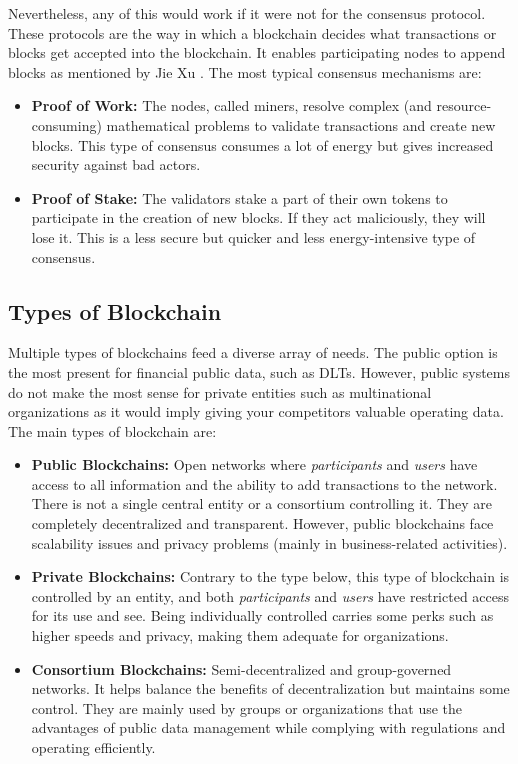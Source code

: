 Nevertheless, any of this would work if it were not for the consensus protocol. These protocols are the way in which a blockchain decides what transactions or blocks get accepted into the blockchain. It enables participating nodes to append blocks as mentioned by Jie Xu \cite{consensusBlockchain}. The most typical consensus mechanisms are:
\begin{itemize}
        \item \textbf{Proof of Work:} The nodes, called miners, resolve complex (and resource-consuming) mathematical problems to validate transactions and create new blocks. This type of consensus consumes a lot of energy but gives increased security against bad actors. 
        \item \textbf{Proof of Stake:} The validators stake a part of their own tokens to participate in the creation of new blocks. If they act maliciously, they will lose it. This is a less secure but quicker and less energy-intensive type of consensus. 
\end{itemize}

\subsection{Types of Blockchain}

Multiple types of blockchains feed a diverse array of needs. The public option is the most present for financial public data, such as DLTs. However, public systems do not make the most sense for private entities such as multinational organizations as it would imply giving your competitors valuable operating data. The main types of blockchain are:
\begin{itemize}
    \item \textbf{Public Blockchains:} Open networks where \textit{participants} and \textit{users} have access to all information and the ability to add transactions to the network. There is not a single central entity or a consortium controlling it. They are completely decentralized and transparent. However, public blockchains face scalability issues and privacy problems (mainly in business-related activities).
    \item \textbf{Private Blockchains:} Contrary to the type below, this type of blockchain is controlled by an entity, and both \textit{participants} and \textit{users} have restricted access for its use and see. Being individually controlled carries some perks such as higher speeds and privacy, making them adequate for organizations. 
    \item \textbf{Consortium Blockchains:} Semi-decentralized and group-governed networks. It helps balance the benefits of decentralization but maintains some control. They are mainly used by groups or organizations that use the advantages of public data management while complying with regulations and operating efficiently. 
\end{itemize}

